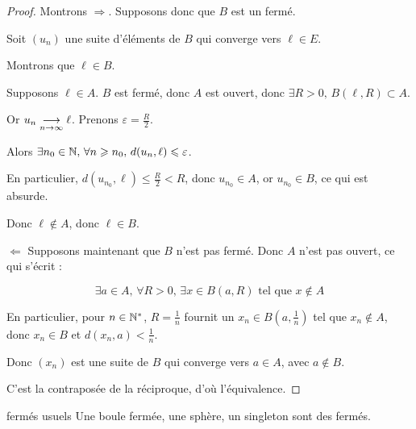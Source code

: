 
\begin{proof}
    Montrons $\Rightarrow$. Supposons donc que $B$ est un fermé.

    Soit $(u_n)$ une suite d'éléments de $B$ qui converge vers $\ell \in E$.

    Montrons que $\ell \in B$.

    Supposons $\ell \in A$. $B$ est fermé, donc $A$ est ouvert, donc $\exists R > 0, \, B(\ell, R) \subset A$.

    Or $u_n \underset{n \to \infty}{\longrightarrow} \ell$. Prenons $\varepsilon = \frac R 2$. 

    Alors $\exists n_0 \in \mathbb{N}, \, \forall n \geqslant n_0, \, d(u_{n}, \ell) \leqslant \varepsilon$. 

    En particulier, $d(u_{n_0}, \ell) \leqslant \frac R 2 < R$, donc $u_{n_0} \in A$, or $u_{n_0} \in B$, ce qui est absurde.

    Donc $\ell \not \in A$, donc $\ell \in B$.

    \avspace $\Leftarrow$ Supposons maintenant que $B$ n'est pas fermé. Donc $A$ n'est pas ouvert, ce qui s'écrit : 

    $$\exists a \in A, \, \forall R > 0, \, \exists x \in B(a, R) \text{ tel que } x \not \in A$$

    En particulier, pour $n \in \mathbb{N}^*$, $R = \frac 1 n$ fournit un $x_n \in B(a, \frac 1 n)$ tel que $x_n \not \in A$, donc $x_n \in B$ 
    et $d(x_n, a) < \frac 1 n$.

    Donc $(x_n)$ est une suite de $B$ qui converge vers $a \in A$, avec $a \not \in B$.

    C'est la contraposée de la réciproque, d'où l'équivalence. 
\end{proof}


\begin{proposition}{fermés usuels}{}
    Une boule fermée, une sphère, un singleton sont des fermés. 
\end{proposition}


